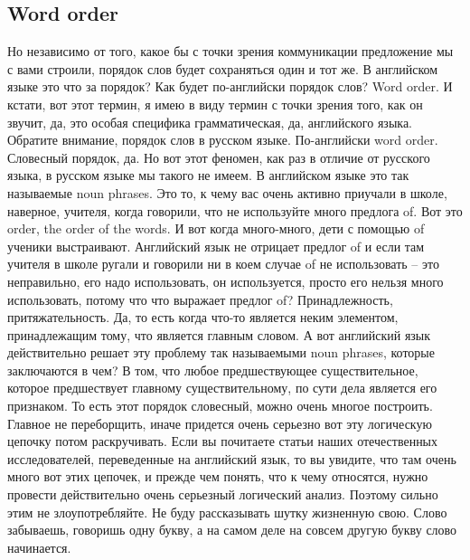 \documentclass[main.tex]{subfiles}
\begin{document}
\subsection{Word order}

Но независимо от того, какое бы с точки зрения коммуникации предложение мы с вами строили, порядок слов будет сохраняться один и тот же.
В английском языке это что за порядок?
Как будет по-английски порядок слов?
Word order.
И кстати, вот этот термин, я имею в виду термин с точки зрения того, как он звучит, да, это особая специфика грамматическая, да, английского языка.
Обратите внимание, порядок слов в русском языке.
По-английски word order.
Словесный порядок, да.
Но вот этот феномен, как раз в отличие от русского языка, в русском языке мы такого не имеем.
В английском языке это так называемые noun phrases.
Это то, к чему вас очень активно приучали в школе, наверное, учителя, когда говорили, что не используйте много предлога of.
Вот это order, the order of the words.
И вот когда много-много, дети с помощью of ученики выстраивают.
Английский язык не отрицает предлог of и если там учителя в школе ругали и говорили ни в коем случае of не использовать -- это неправильно, его надо использовать, он используется, просто его нельзя много использовать, потому что что выражает предлог of?
Принадлежность, притяжательность.
Да, то есть когда что-то является неким элементом, принадлежащим тому, что является главным словом.
А вот английский язык действительно решает эту проблему так называемыми noun phrases, которые заключаются в чем?
В том, что любое предшествующее существительное, которое предшествует главному существительному, по сути дела является его признаком.
То есть этот порядок словесный, можно очень многое построить.
Главное не переборщить, иначе придется очень серьезно вот эту логическую цепочку потом раскручивать.
Если вы почитаете статьи наших отечественных исследователей, переведенные на английский язык, то вы увидите, что там очень много вот этих цепочек, и прежде чем понять, что к чему относятся, нужно провести действительно очень серьезный логический анализ.
Поэтому сильно этим не злоупотребляйте.
Не буду рассказывать шутку жизненную свою.
Слово забываешь, говоришь одну букву, а на самом деле на совсем другую букву слово начинается.
\end{document}
